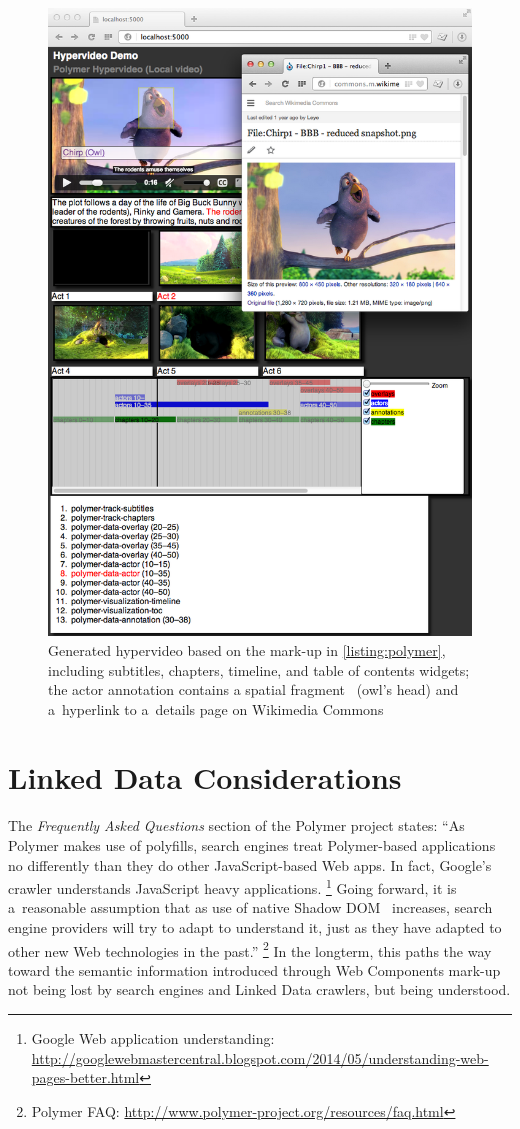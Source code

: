 \documentclass[runningheads,a4paper]{llncs}
\begin{document}
\begin{figure}[htb!]
  \centering
  \includegraphics[width=0.53\linewidth]{screenshot}
  \caption{Generated hypervideo based on the mark-up in \autoref{listing:polymer},
  including subtitles, chapters, timeline, and table of contents widgets;
  the actor annotation contains a spatial fragment~\cite{troncy2012mediafragments}
  (owl's head) and a~hyperlink
  to a~details page on Wikimedia Commons}
  \label{fig:screenshot}
\end{figure}

\section{Linked Data Considerations}

The \emph{Frequently Asked Questions} section of the Polymer project states:
``As Polymer makes use of polyfills, search engines treat Polymer-based
applications no differently than they do other JavaScript-based Web apps.
In fact, Google’s crawler understands JavaScript heavy applications.%
\footnote{Google Web application understanding:
\url{http://googlewebmastercentral.blogspot.com/2014/05/understanding-web-pages-better.html}}
Going forward, it is a~reasonable assumption
that as use of native Shadow DOM~\cite{glazkov2014shadowdom} increases,
search engine providers will try to adapt to understand it,
just as they have adapted to other new Web technologies in the past.''%
\footnote{Polymer FAQ:
\url{http://www.polymer-project.org/resources/faq.html}}
In the longterm, this paths the way toward the semantic information
introduced through Web Components mark-up
not being lost by search engines and Linked Data crawlers,
but being understood.
\end{document}

